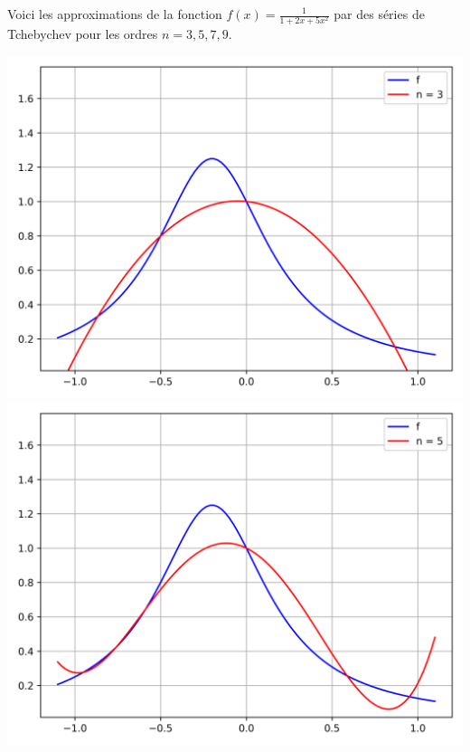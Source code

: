 \documentclass[11pt,class=report,crop=false]{standalone}
\begin{document}
\begin{exemple}
Voici les approximations de la fonction $f(x) = \frac{1}{1+2x+5x^2}$ par des séries de Tchebychev pour les ordres $n=3,5,7,9$.
\begin{center}
  \includegraphics[scale=\myscale,scale=0.45]{figures/approx-tchebychev-03-3} \qquad
  \includegraphics[scale=\myscale,scale=0.45]{figures/approx-tchebychev-03-5} 


\end{center}
\end{exemple}
\end{document}
